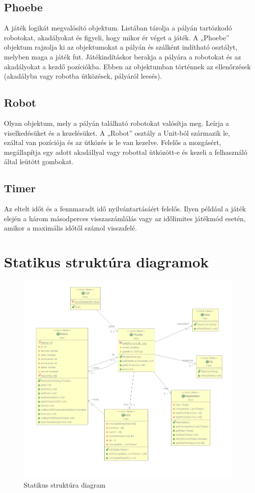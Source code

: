 \subsection{Phoebe}
A játék logikát megvalósító objektum. Listában tárolja a pályán tartózkodó robotokat, akadályokat és figyeli, hogy mikor ér véget a játék. A „Phoebe” objektum rajzolja ki az objektumokat a pályán és szálként indítható osztályt, melyben maga a játék fut. Játékindításkor berakja a pályára a robotokat és az akadályokat a kezdő pozíciókba. Ebben az objektumban történnek az ellenőrzések (akadályba vagy robotba ütközések, pályáról leesés).
\subsection{Robot}
Olyan objektum, mely a pályán található robotokat valósítja meg. Leírja a viselkedésüket és a kezelésüket. A „Robot” osztály a Unit-ból származik le, ezáltal van pozíciója és az ütközés is le van kezelve. Felelős a mozgásért, megállapítja egy adott akadállyal vagy robottal ütközött-e és kezeli a felhasználó által leütött gombokat.
\subsection{Timer}
Az eltelt időt és a fennmaradt idő nyilvántartásáért felelős. Ilyen például a játék elején a három másodperces visszaszámlálás vagy az időlimites játékmód esetén, amikor a maximális időtől számol visszafelé.

\section{Statikus struktúra diagramok}

\begin{figure}[h]
\begin{center}
\includegraphics[width=17cm]{images/struktdiagram.PNG}
\caption{Statikus struktúra diagram}
\label{fig:example3}
\end{center}
\end{figure}
\pagebreak
\pagebreak

